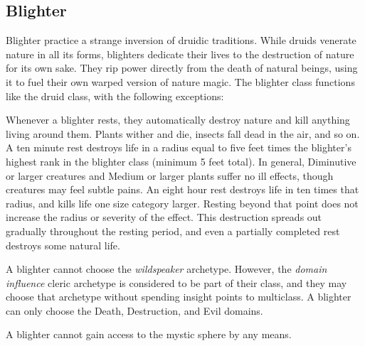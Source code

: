   \subsection{Blighter}
    Blighter practice a strange inversion of druidic traditions.
    While druids venerate nature in all its forms, blighters dedicate their lives to the destruction of nature for its own sake.
    They rip power directly from the death of natural beings, using it to fuel their own warped version of nature magic.
    The blighter class functions like the druid class, with the following exceptions:
    \begin{raggeditemize}
      \item Whenever a blighter rests, they automatically destroy nature and kill anything living around them.
        Plants wither and die, insects fall dead in the air, and so on.
        A ten minute rest destroys life in a radius equal to five feet times the blighter's highest rank in the blighter class (minimum 5 feet total).
        In general, Diminutive or larger creatures and Medium or larger plants suffer no ill effects, though creatures may feel subtle pains.
        An eight hour rest destroys life in ten times that radius, and kills life one size category larger.
        Resting beyond that point does not increase the radius or severity of the effect.
        This destruction spreads out gradually throughout the resting period, and even a partially completed rest destroys some natural life.
      \item A blighter cannot choose the \textit{wildspeaker} archetype.
        However, the \textit{domain influence} cleric archetype is considered to be part of their class, and they may choose that archetype without spending insight points to multiclass.
        A blighter can only choose the Death, Destruction, and Evil domains.
      \item A blighter cannot gain access to the  mystic sphere by any means.
    \end{raggeditemize}

